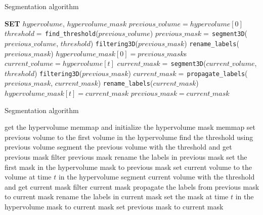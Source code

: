 \begin{algorithm}[H]
    \label{alg:segmentation}
    \caption{Segmentation algorithm}
    \begin{algorithmic}[1]
    \STATE \textbf{SET} $hypervolume$, $hypervolume\_mask$
    \STATE $previous\_volume=hypervolume[0]$
    \STATE $threshold=\,$\texttt{find\_threshold}($previous\_volume$)
    \STATE $previous\_mask=\,$\texttt{segment3D}($previous\_volume$, $threshold$)
    \STATE \texttt{filtering3D}($previous\_mask$)
    \STATE \texttt{rename\_labels}($previous\_mask$)
    \STATE $hypervolume\_mask[0]=previous\_mask$s
    \STATE $current\_volume=hypervolume[t]$
    \STATE $current\_mask=\,$\texttt{segment3D}($current\_volume$, $threshold$)
    \STATE \texttt{filtering3D}($previous\_mask$)
    \STATE $current\_mask=\,$\texttt{propagate\_labels}($previous\_mask$, $current\_mask$)    
    \STATE \texttt{rename\_labels}($current\_mask$)
    \STATE $hypervolume\_mask[t]=current\_mask$
    \STATE $previous\_mask=current\_mask$
    \ENDFOR
    \end{algorithmic}
\end{algorithm}

\begin{algorithm}[H]
    \label{alg:segmentation2}
    \caption{Segmentation algorithm}
    \begin{algorithmic}[1]
    \STATE get the hypervolume memmap and initialize the hypervolume mask memmap
    \STATE set previous volume to the first volume in the hypervolume
    \STATE find the threshold using previous volume
    \STATE segment the previous volume with the threshold and get previous mask
    \STATE filter previous mask
    \STATE rename the labels in previous mask
    \STATE set the first mask in the hypervolume mask to previous mask
    \STATE set current volume to the volume at time $t$ in the hypervolume
    \STATE segment current volume with the threshold and get current mask
    \STATE filter current mask
    \STATE propagate the labels from previous mask to current mask
    \STATE rename the labels in current mask
    \STATE set the mask at time $t$ in the hypervolume mask to current mask
    \STATE set previous mask to current mask
    \ENDFOR
    \end{algorithmic}
\end{algorithm}